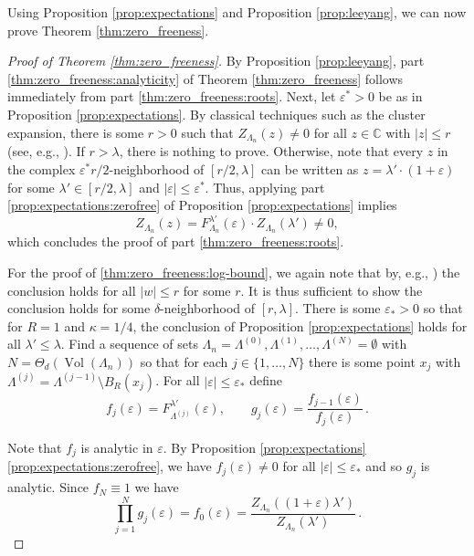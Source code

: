 \documentclass[10pt]{amsart}
\theoremstyle{definition}
\theoremstyle{remark}
\def\eps{{\varepsilon}}
\newcommand{\Vol}{\operatorname{Vol}}
\newcommand{\C}{\mathbb{C}}
\newcommand{\region}{\Lambda}
\newcommand{\activity}{\lambda}
\newcommand{\absolute}[1]{\left\lvert#1\right\rvert}
\newcommand{\epsbound}{\varepsilon^{*}}
\begin{document}
	Using Proposition \ref{prop:expectations} and Proposition \ref{prop:leeyang}, we can now prove Theorem \ref{thm:zero_freeness}.
	\begin{proof}[Proof of Theorem \ref{thm:zero_freeness}]
		By Proposition \ref{prop:leeyang}, part \ref{thm:zero_freeness:analyticity} of Theorem \ref{thm:zero_freeness} follows immediately from part \ref{thm:zero_freeness:roots}.
		Next, let $\epsbound > 0$ be as in Proposition \ref{prop:expectations}.
		By classical techniques such as the cluster expansion, there is some $r>0$ such that $Z_{\region_n}(z) \neq 0$ for all $z \in \C$ with $\absolute{z} \le r$ (see, e.g., \cite[Theorem~4.5.2]{ruelle1969statistical}).
		If $r > \activity$, there is nothing to prove.
		Otherwise, note that every $z$ in the complex $\epsbound r/2$-neighborhood of $[r/2, \activity]$ can be written as $z = \activity' \cdot (1 + \varepsilon)$ for some $\activity' \in [r/2, \activity]$ and $\absolute{\varepsilon} \le \epsbound$.
		Thus, applying part \ref{prop:expectations:zerofree} of Proposition \ref{prop:expectations} implies 
		\[
		Z_{\region_n}(z) = F_{\region_n}^{\activity'}(\varepsilon)  \cdot Z_{\region_n}(\activity') \neq 0,
		\]
		which concludes the proof of part \ref{thm:zero_freeness:roots}.  
		
		
		For the proof of \ref{thm:zero_freeness:log-bound}, we again note that by, e.g., \cite[Theorem~4.5.2]{ruelle1969statistical}) the conclusion holds for all $|w| \leq r$ for some $r$.  It is thus sufficient to show the conclusion holds for some $\delta$-neighborhood of $[r,\lambda]$.  There is some $\eps_\ast > 0$ so that for $R = 1$ and $\kappa = 1/4$, the conclusion of Proposition \ref{prop:expectations} holds for all $\lambda' \leq \lambda$.    
		Find a sequence of sets $\Lambda_n = \Lambda^{(0)}, \Lambda^{(1)},\ldots, \Lambda^{(N)} = \emptyset$ with $N = \Theta_{d}(\Vol(\Lambda_n))$ so that for each $j \in \{1,\ldots,N\}$ there is some point $x_j$ with $\Lambda^{(j)} = \Lambda^{(j-1)} \setminus B_R(x_j)$.  For all $|\eps| \leq \eps_\ast$ define \begin{equation}
			f_j(\eps) = F_{\Lambda^{(j)}}^{\activity'}(\eps), \qquad g_j(\eps) = \frac{f_{j-1}(\eps)}{f_{j}(\eps)}\,.
		\end{equation}
		
		Note that $f_j$ is analytic in $\eps$.  By Proposition \ref{prop:expectations} \ref{prop:expectations:zerofree}, we have $f_{j}(\eps) \neq 0$ for all $|\eps| \leq \eps_\ast$ and so $g_j$ is analytic.  Since $f_N \equiv 1$ we have \begin{equation}\label{eq:Z-telescope}   \prod_{j = 1}^N g_j (\eps)=f_0(\eps)=\frac{Z_{\Lambda_n}((1 + \eps)\lambda')}{Z_{\Lambda_n}(\lambda')}\,.\end{equation}
		

\end{proof}
\end{document}

